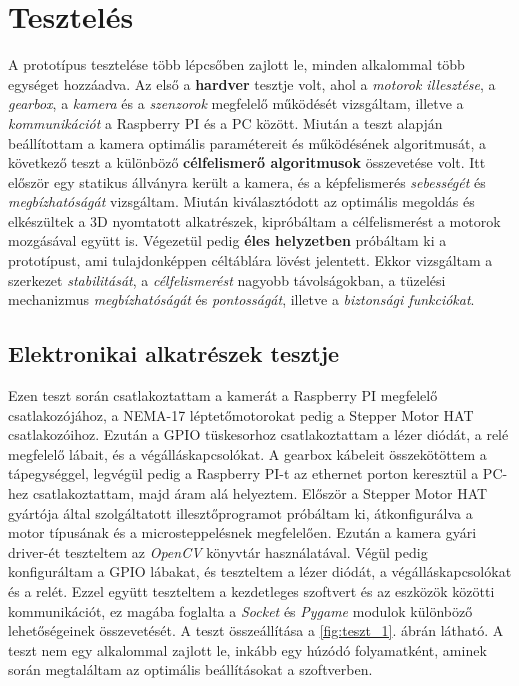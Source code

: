 \chapter{Tesztelés}
A prototípus tesztelése több lépcsőben zajlott le, minden alkalommal több egységet hozzáadva. Az első a \textbf{hardver} tesztje volt, ahol a \textsl{motorok illesztése}, a \textsl{gearbox}, a \textsl{kamera} és a \textsl{szenzorok} megfelelő működését vizsgáltam, illetve a \textsl{kommunikációt} a Raspberry PI és a PC között. Miután a teszt alapján beállítottam a kamera optimális paramétereit és működésének algoritmusát, a következő teszt a különböző \textbf{célfelismerő algoritmusok} összevetése volt. Itt először egy statikus állványra került a kamera, és a képfelismerés \textsl{sebességét} és \textsl{megbízhatóságát} vizsgáltam. Miután kiválasztódott az optimális megoldás és elkészültek a 3D nyomtatott alkatrészek, kipróbáltam a célfelismerést a motorok mozgásával együtt is. Végezetül pedig \textbf{éles helyzetben} próbáltam ki a prototípust, ami tulajdonképpen céltáblára lövést jelentett. Ekkor vizsgáltam a szerkezet \textsl{stabilitását}, a \textsl{célfelismerést} nagyobb távolságokban, a tüzelési mechanizmus \textsl{megbízhatóságát} és \textsl{pontosságát}, illetve a \textsl{biztonsági funkciókat}.

\section{Elektronikai alkatrészek tesztje}
Ezen teszt során csatlakoztattam a kamerát a Raspberry PI megfelelő csatlakozójához, a NEMA-17 léptetőmotorokat pedig a Stepper Motor HAT csatlakozóihoz. Ezután a GPIO tüskesorhoz csatlakoztattam a lézer diódát, a relé megfelelő lábait, és a végálláskapcsolókat. A gearbox kábeleit összekötöttem a tápegységgel, legvégül pedig a Raspberry PI-t az ethernet porton keresztül a PC-hez csatlakoztattam, majd áram alá helyeztem. Először a Stepper Motor HAT gyártója által szolgáltatott illesztőprogramot próbáltam ki, átkonfigurálva a motor típusának és a microsteppelésnek megfelelően. Ezután a kamera gyári driver-ét teszteltem az \textsl{OpenCV} könyvtár használatával. Végül pedig konfiguráltam a GPIO lábakat, és teszteltem a lézer diódát, a végálláskapcsolókat és a relét. Ezzel együtt teszteltem a kezdetleges szoftvert és az eszközök közötti kommunikációt, ez magába foglalta a \textsl{Socket} és \textsl{Pygame} modulok különböző lehetőségeinek összevetését. A teszt összeállítása a \ref{fig:teszt_1}. ábrán látható. A teszt nem egy alkalommal zajlott le, inkább egy húzódó folyamatként, aminek során megtaláltam az optimális beállításokat a szoftverben.


